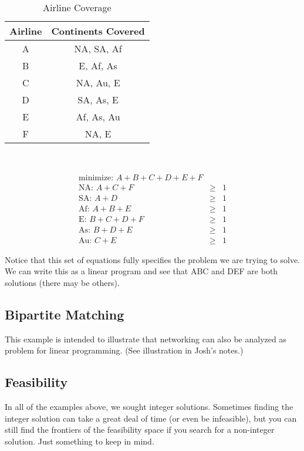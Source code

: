 \documentclass[12pt,letter]{article}
\begin{document}
\begin{table}[h!]\centering
 \caption{Airline Coverage}
\label{airlines}
\begin{tabular}{c|c}\hline
Airline & Continents Covered \\
\hline
A & NA, SA, Af \\
B & E, Af, As \\
C & NA, Au, E \\
D & SA, As, E \\
E & Af, As, Au \\
F & NA, E \\
\hline
\end{tabular} \\
\end{table}

\begin{eqnarray} %
\label{airlineeqn}
\text{minimize:  } A+B+C+D+E+F \\
\text{NA:  } A + C + F  &\geq& 1 \\
\text{SA:  } A + D  &\geq& 1 \\
\text{Af:  } A + B + E  &\geq& 1 \\ 
\text{E:  } B + C + D + F &\geq& 1 \\ 
\text{As:  } B + D + E  &\geq& 1 \\
\text{Au:  } C + E  &\geq& 1 
\end{eqnarray}

Notice that this set of equations fully specifies the
problem we are trying to solve. We can write this as a linear
program and see that ABC and DEF are both solutions (there may be
others).

\subsection{Bipartite Matching}
This example is intended to illustrate that networking can also be
analyzed as problem for linear programming. (See illustration in
Josh's notes.) %

\subsection{Feasibility}

In all of the examples above, we sought integer solutions. Sometimes
finding the integer solution can take a great deal of time (or even be
infeasible), but you can still find the frontiers of the feasibility
space if you search for a non-integer solution. Just something to keep
in mind. 
 

\pagebreak
\onehalfspacing



\pagebreak
\end{document}
